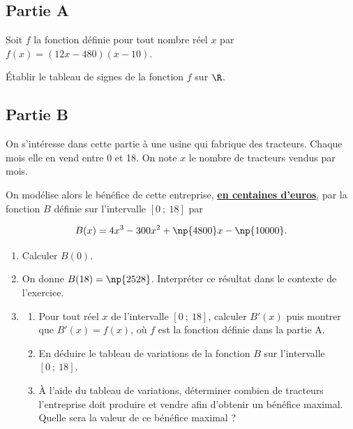 \subsection*{Partie A}

\begin{minipage}{0.7\linewidth}
	Soit $f$ la fonction définie pour tout nombre réel $x$ par $f(x) = (12x-480)(x-10)$.

	Établir le tableau de signes de la fonction $f$ sur $\R$.
\end{minipage}
\hfill
{}

\subsection*{Partie B}

On s'intéresse dans cette partie à une usine qui fabrique des tracteurs. Chaque mois elle en vend entre 0 et 18. On note $x$ le nombre de tracteurs vendus par mois.

On modélise alors le bénéfice de cette entreprise, \textbf{\uline{en centaines d'euros}}, par la fonction $B$ définie sur l'intervalle $[0~;~18]$ par 

\[ B(x) = 4x^3 - 300x^2 + \np{4800}x - \np{10000}. \]

\begin{enumerate}
	\item Calculer $B(0)$.
	\item On donne $B(18) = \np{2528}$. Interpréter ce résultat dans le contexte de l'exercice.
	\item
	\begin{enumerate}
		\item Pour tout réel $x$ de l'intervalle $[0 ~;~18]$, calculer $B'(x)$ puis montrer que $B'(x) = f(x)$, où $f$ est la fonction définie dans la partie A.
		\item En déduire le tableau de variations de la fonction $B$ sur l'intervalle $[0~;~18]$.
		\item À l'aide du tableau de variations, déterminer combien de tracteurs l'entreprise doit produire et vendre afin d'obtenir un bénéfice maximal. Quelle sera la valeur de ce bénéfice maximal ?
	\end{enumerate}
\end{enumerate}
